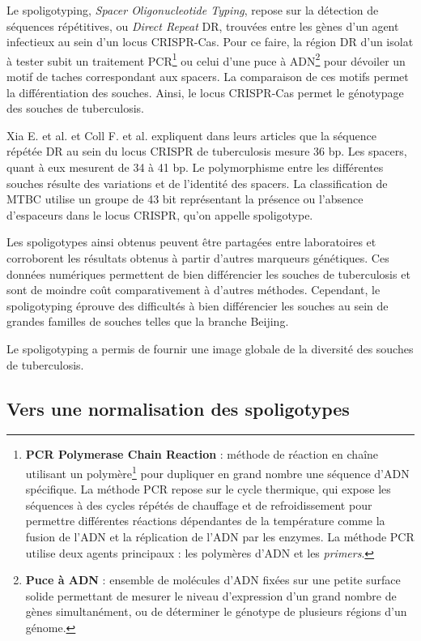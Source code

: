 \documentclass[twoside,a4paper,11pt,frenchb,openany]{report}
\begin{document}
Le spoligotyping, \textit{Spacer Oligonucleotide Typing}, repose sur la détection de séquences répétitives, ou \textit{Direct Repeat} DR, trouvées entre les gènes d'un agent infectieux au sein d'un locus CRISPR-Cas. Pour ce faire, la région DR d'un isolat à tester subit un traitement PCR\footnote{\textbf{PCR Polymerase Chain Reaction} : méthode de réaction en chaîne utilisant un polymère\footnote{\textbf{Polymère} : macromolécule répétant un même motif structural.} pour dupliquer en grand nombre une séquence d'ADN spécifique. La méthode PCR repose sur le cycle thermique, qui expose les séquences à des cycles répétés de chauffage et de refroidissement pour permettre différentes réactions dépendantes de la température comme la fusion de l'ADN et la réplication de l'ADN par les enzymes. La méthode PCR utilise deux agents principaux : les polymères d'ADN et les \textit{primers}.} ou celui d'une puce à ADN\footnote{\textbf{Puce à ADN} : ensemble de molécules d'ADN fixées sur une petite surface solide permettant de mesurer le niveau d'expression d'un grand nombre de gènes simultanément, ou de déterminer le génotype de plusieurs régions d'un génome.} pour dévoiler un motif de taches correspondant aux spacers. La comparaison de ces motifs permet la différentiation des souches. Ainsi, le locus CRISPR-Cas permet le génotypage des souches de tuberculosis.

Xia E. et al. et Coll F. et al. expliquent dans leurs articles \cite{xia, coll} que la séquence répétée DR au sein du locus CRISPR de tuberculosis mesure 36 bp. Les spacers, quant à eux mesurent de 34 à 41 bp. Le polymorphisme entre les différentes souches résulte des variations et de l'identité des spacers. La classification de MTBC utilise un groupe de 43 bit représentant la présence ou l'absence d'espaceurs dans le locus CRISPR, qu'on appelle spoligotype.

Les spoligotypes ainsi obtenus peuvent être partagées entre laboratoires et corroborent les résultats obtenus à partir d'autres marqueurs génétiques. Ces données numériques permettent de bien différencier les souches de tuberculosis et sont de moindre coût comparativement à d'autres méthodes. Cependant, le spoligotyping éprouve des difficultés à bien différencier les souches au sein de grandes familles de souches telles que la branche Beijing.

Le spoligotyping a permis de fournir une image globale de la diversité des souches de tuberculosis.


\subsection{Vers une normalisation des spoligotypes}
\end{document}
